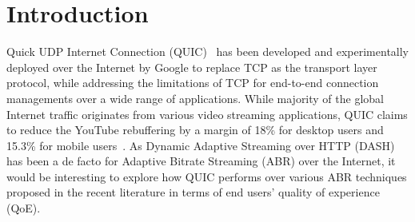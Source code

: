 \section{Introduction}
Quick UDP Internet Connection (QUIC)~\cite{langley2017quic} has been developed and experimentally deployed over the Internet by Google to replace TCP as the transport layer protocol, while addressing the limitations of TCP for end-to-end connection managements over a wide range of applications. While majority of the global Internet traffic originates from various video streaming applications, QUIC claims to reduce the YouTube rebuffering by a margin of 18\% for desktop users and 15.3\% for mobile users~\cite{langley2017quic}. As Dynamic Adaptive Streaming over HTTP (DASH)~\cite{stockhammer2011dynamic} has been a de facto for Adaptive Bitrate Streaming (ABR) over the Internet, it would be interesting to explore how QUIC performs over various ABR techniques proposed in the recent literature in terms of end users' quality of experience (QoE).


